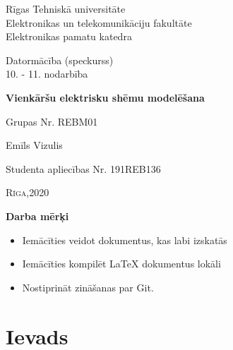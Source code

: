 \documentclass{article}
\begin{document}
\begin{titlepage}
\begin{center}
\large{Rīgas Tehniskā universitāte \\\vspace{3mm} Elektronikas un telekomunikāciju fakultāte \\\vspace{3mm} Elektronikas pamatu katedra}
\end{center}

\vspace{3cm}

\begin{center}
Datormācība (speckurss)\\10. - 11. nodarbība
\end{center}

\begin{center}
\textbf{Vienkāršu elektrisku shēmu modelēšana}
\end{center}

\vspace{5cm}

\begin{flushright}
Grupas Nr. REBM01
 \end{flushright}

 \begin{flushright}
Emīls Vizulis
 \end{flushright}
 
 \begin{flushright}
Studenta apliecības Nr. 191REB136
 \end{flushright}

\vfill
\begin{center}
\scshape{Rīga,2020}
\end{center}
\end{titlepage}
\renewcommand*\contentsname{Saturs}
\tableofcontents
\newpage

\vspace{0.25cm}
    
\textbf{Darba mērķi}
\begin{itemize}
    \item Iemācīties veidot dokumentus, kas labi izskatās
    \item Iemācīties kompilēt LaTeX dokumentus lokāli
    \item Nostiprināt zināšanas par Git.
\end{itemize}

\section{Ievads}
\end{document}
